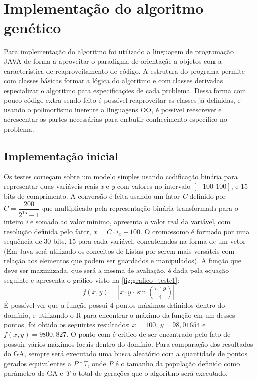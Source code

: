 
\chapter{Implementação do algoritmo genético}
\label{chap:implementGA}

Para implementação do algoritmo foi utilizado a linguagem de programação JAVA de forma a aproveitar o paradigma de orientação a objetos com a característica de reaproveitamento de código. A estrutura do programa permite com classes básicas formar a lógica do algoritmo e com classes derivadas especializar o algoritmo para especificações de cada problema. Dessa forma com pouco código extra sendo feito é possível reaproveitar as classes já definidas, e usando o polimorfismo inerente a linguagens OO, é possível reescrever e acrescentar as partes necessárias para embutir conhecimento específico no problema.

\section{Implementação inicial}
Os testes começam sobre um modelo simples usando codificação binária para representar duas variáveis reais \textit{x} e \textit{y} com valores no intervalo \([-100,100]\), e 15 bits de comprimento. A conversão é feita usando um fator \textit{C} definido por \(C = \dfrac{200}{2^{15} - 1}\) que multiplicado pela representação binária transformada para o inteiro \textit{i} e somado ao valor mínimo, apresenta o valor real da variável, com resolução definida pelo fator,
\(x = C \cdot i_x - 100\). O cromossomo é formado por uma sequência de 30 bits, 15 para cada variável, concatenados na forma de um vetor (Em Java será utilizado os conceitos de Listas por serem mais versáteis com relação aos elementos que podem ser guardados e manipulados). A função que deve ser maximizada, que será a mesma de avaliação, é dada pela equação seguinte e apresenta o gráfico visto na \autoref{fig:grafico_teste1}: 
\[f(x,y) = \left| x \cdot y \cdot \sin\left(\frac{\pi \cdot y}{4}\right) \right|\] 
É possível ver que a função possui 4 pontos máximos definidos dentro do domínio, e utilizando o R para encontrar o máximo da função em um desses pontos, foi obtido os seguintes resultados: \(x = 100\), \(y = 98,01654\) e \(f(x,y) = 9800,827\). O ponto com é critico de ser encontrado pelo fato de possuir vários máximos locais dentro do domínio. Para comparação dos resultados do GA, sempre será executado uma busca aleatório com a quantidade de pontos gerados equivalentes a \(P * T\), onde \textit{P} é o tamanho da população definido como parâmetro do GA e \textit{T} o total de gerações que o algoritmo será executado.

